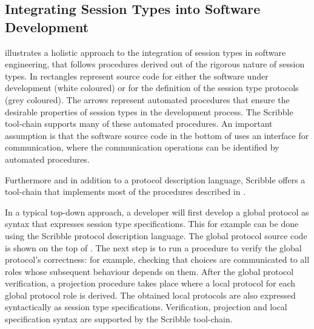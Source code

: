 \subsection{Integrating Session Types into Software Development}%
\label{sec:sessions_integrate}

 illustrates a holistic approach to the integration of session
types in software engineering, that follows procedures derived out of the rigorous
nature of session types. In  rectangles
represent source code for either the software
under development (white coloured) or for the definition
of the session type protocols (grey coloured).
The arrows
represent automated procedures that ensure
the desirable properties of session types
in the development process. The Scribble
tool-chain supports many of these automated
procedures.
An important assumption
is that the software source code in the
bottom of  uses an interface
for communication, where the communication
operations can be identified by automated
procedures.

Furthermore and in addition to a protocol description language,
Scribble offers a tool-chain that implements most of the procedures
described in .







In a typical top-down approach, a developer will first develop a global protocol
as syntax that expresses session type specifications.
This for example can be done
using the Scribble protocol description language.
The global protocol source code is shown
on the top of .
The next step is to run a procedure to verify the
global protocol's correctness: for example, checking that choices
are communicated to all roles whose subsequent behaviour depends on them.
After the global protocol verification, a projection
procedure takes place where a local protocol
for each global protocol role is derived.
The obtained local protocols are also expressed
syntactically as session type specifications.
Verification, projection and local specification
syntax are supported by the Scribble tool-chain.

